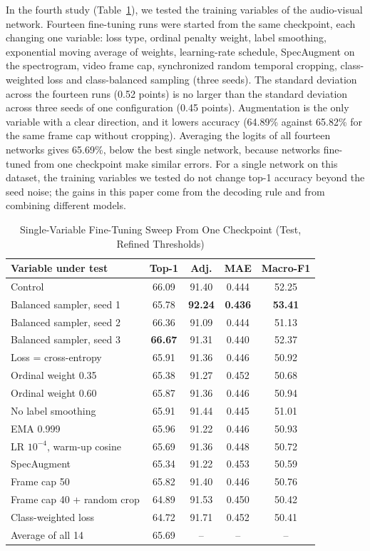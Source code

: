 \documentclass[journal]{IEEEtran}
\begin{document}
In the fourth study (Table~\ref{tab_sweep}), we tested the training variables of the audio-visual network. Fourteen fine-tuning runs were started from the same checkpoint, each changing one variable: loss type, ordinal penalty weight, label smoothing, exponential moving average of weights, learning-rate schedule, SpecAugment on the spectrogram, video frame cap, synchronized random temporal cropping, class-weighted loss and class-balanced sampling (three seeds). The standard deviation across the fourteen runs (0.52 points) is no larger than the standard deviation across three seeds of one configuration (0.45 points). Augmentation is the only variable with a clear direction, and it lowers accuracy (64.89\% against 65.82\% for the same frame cap without cropping). Averaging the logits of all fourteen networks gives 65.69\%, below the best single network, because networks fine-tuned from one checkpoint make similar errors. For a single network on this dataset, the training variables we tested do not change top-1 accuracy beyond the seed noise; the gains in this paper come from the decoding rule and from combining different models.

\begin{table}[!t]
\setlength{\tabcolsep}{3pt}
\renewcommand{\arraystretch}{1.15}
\caption{Single-Variable Fine-Tuning Sweep From One Checkpoint (Test, Refined Thresholds)}
\label{tab_sweep}
\centering
\begin{tabular}{lcccc}
\hline
Variable under test & Top-1 & Adj. & MAE & Macro-F1\\
\hline
Control & 66.09 & 91.40 & 0.444 & 52.25\\
Balanced sampler, seed 1 & 65.78 & \textbf{92.24} & \textbf{0.436} & \textbf{53.41}\\
Balanced sampler, seed 2 & 66.36 & 91.09 & 0.444 & 51.13\\
Balanced sampler, seed 3 & \textbf{66.67} & 91.31 & 0.440 & 52.37\\
Loss = cross-entropy & 65.91 & 91.36 & 0.446 & 50.92\\
Ordinal weight 0.35 & 65.38 & 91.27 & 0.452 & 50.68\\
Ordinal weight 0.60 & 65.87 & 91.36 & 0.446 & 50.94\\
No label smoothing & 65.91 & 91.44 & 0.445 & 51.01\\
EMA 0.999 & 65.96 & 91.22 & 0.446 & 50.93\\
LR $10^{-4}$, warm-up cosine & 65.69 & 91.36 & 0.448 & 50.72\\
SpecAugment & 65.34 & 91.22 & 0.453 & 50.59\\
Frame cap 50 & 65.82 & 91.40 & 0.446 & 50.76\\
Frame cap 40 + random crop & 64.89 & 91.53 & 0.450 & 50.42\\
Class-weighted loss & 64.72 & 91.71 & 0.452 & 50.41\\
\hline
Average of all 14 & 65.69 & -- & -- & --\\
\hline
\end{tabular}
\end{table}
\end{document}
